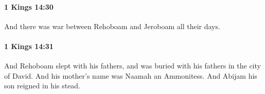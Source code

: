 		\paragraph{1 Kings 14:30} %
			\label{1KINGS-14-30}

			And there was war between Rehoboam and Jeroboam all their days.


		\paragraph{1 Kings 14:31} %
			\label{1KINGS-14-31}

			And Rehoboam slept with his fathers, and was buried with his fathers in the city of David. And his mother’s name was Naamah an Ammonitess. And Abijam his son reigned in his stead.

